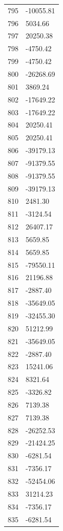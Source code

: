 \documentclass[a4paper,11pt]{article}
\begin{document}
\begin{center}
\begin{longtable}{|R{1.5cm}|R{2.5cm}|}
  795 &    -10055.81 \\
  796 &      5034.66 \\
  797 &     20250.38 \\
  798 &     -4750.42 \\
  799 &     -4750.42 \\
  800 &    -26268.69 \\
  801 &      3869.24 \\
  802 &    -17649.22 \\
  803 &    -17649.22 \\
  804 &     20250.41 \\
  805 &     20250.41 \\
  806 &    -39179.13 \\
  807 &    -91379.55 \\
  808 &    -91379.55 \\
  809 &    -39179.13 \\
  810 &      2481.30 \\
  811 &     -3124.54 \\
  812 &     26407.17 \\
  813 &      5659.85 \\
  814 &      5659.85 \\
  815 &    -79550.11 \\
  816 &     21196.88 \\
  817 &     -2887.40 \\
  818 &    -35649.05 \\
  819 &    -32455.30 \\
  820 &     51212.99 \\
  821 &    -35649.05 \\
  822 &     -2887.40 \\
  823 &     15241.06 \\
  824 &      8321.64 \\
  825 &     -3326.82 \\
  826 &      7139.38 \\
  827 &      7139.38 \\
  828 &    -26252.53 \\
  829 &    -21424.25 \\
  830 &     -6281.54 \\
  831 &     -7356.17 \\
  832 &    -52454.06 \\
  833 &     31214.23 \\
  834 &     -7356.17 \\
  835 &     -6281.54 \\

\end{longtable}
\end{center}
\end{document}
